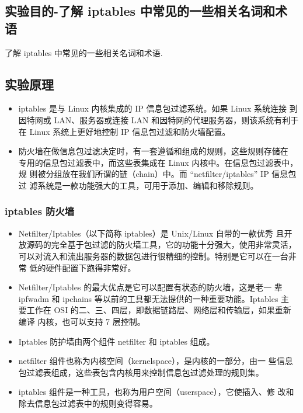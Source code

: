 \subsection{实验目的-了解 iptables 中常见的一些相关名词和术语}
了解 iptables 中常见的一些相关名词和术语.
%
\subsection{实验原理}
\begin{itemize}
  \item iptables 是与 Linux 内核集成的 IP 信息包过滤系统。如果 Linux 系统连接
    到因特网或 LAN、服务器或连接 LAN 和因特网的代理服务器，则该系统有利于在
    Linux 系统上更好地控制 IP 信息包过滤和防火墙配置。
  \item 防火墙在做信息包过滤决定时，有一套遵循和组成的规则，这些规则存储在
    专用的信息包过滤表中，而这些表集成在 Linux 内核中。在信息包过滤表中，规
    则被分组放在我们所谓的链（chain）中。而 ``netfilter/iptables'' IP 信息包过
    滤系统是一款功能强大的工具，可用于添加、编辑和移除规则。
\end{itemize}
%
\subsubsection{iptables 防火墙}
\begin{itemize}
  \item Netfilter/Iptables（以下简称 iptables）是 Unix/Linux 自带的一款优秀
    且开放源码的完全基于包过滤的防火墙工具，它的功能十分强大，使用非常灵活，
    可以对流入和流出服务器的数据包进行很精细的控制。特别是它可以在一台非常
    低的硬件配置下跑得非常好。
  \item Netfilter/Iptables 的最大优点是它可以配置有状态的防火墙，这是老一
    辈 ipfwadm 和 ipchains 等以前的工具都无法提供的一种重要功能。Iptables 主
    要工作在 OSI 的二、三、四层，即数据链路层、网络层和传输层，如果重新编译
    内核，也可以支持 7 层控制。
  \item Iptables 防护墙由两个组件 netfilter 和 iptables 组成。
  \item netfilter 组件也称为内核空间（kernelspace），是内核的一部分，由一
    些信息包过滤表组成，这些表包含内核用来控制信息包过滤处理的规则集。
  \item iptables 组件是一种工具，也称为用户空间（userspace），它使插入、修
    改和除去信息包过滤表中的规则变得容易。
\end{itemize}
%

